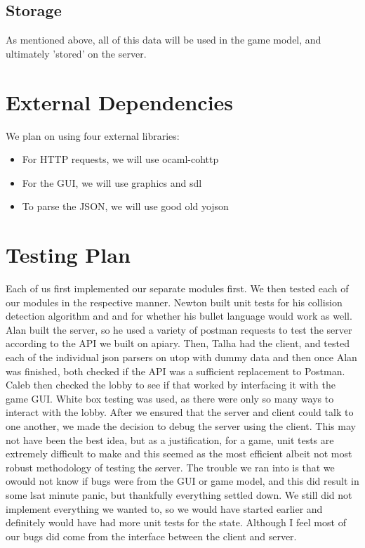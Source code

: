 \documentclass{article}
\begin{document}
    \subsection{Storage}
    As mentioned above, all of this data will be used in the game model, and ultimately 'stored' on the server.

    \section{External Dependencies}
    We plan on using four external libraries:
    \begin{itemize}
   	 \item For HTTP requests, we will use ocaml-cohttp
    	\item For the GUI, we will use graphics and sdl
	\item To parse the JSON, we will use good old yojson
    \end{itemize}

    \section{Testing Plan}
    Each of us first implemented our separate modules first. We then tested each of our modules in the respective manner. Newton built unit tests for his collision detection algorithm and and for whether his bullet language would work as well. Alan built the server, so he used a variety of postman requests to test the server according to the API we built on apiary. Then, Talha had the client, and tested each of the individual json parsers on utop with dummy data and then once Alan was finished, both checked if the API was a sufficient replacement to Postman. Caleb then checked the lobby to see if that worked by interfacing it with the game GUI. White box testing was used, as there were only so many ways to interact with the lobby. After we ensured that the server and client could talk to one another, we made the decision to debug the server using the client. This may not have been the best idea, but as a justification, for a game, unit tests are extremely difficult to make and this seemed as the most efficient albeit not most robust methodology of testing the server. The trouble we ran into is that we owould not know if bugs were from the GUI or game model, and this did result in some lsat minute panic, but thankfully everything settled down. We still did not implement everything we wanted to, so we would have started earlier and definitely would have had more unit tests for the state. Although I feel most of our bugs did come from the interface between the client and server.\\
    
\end{document}
